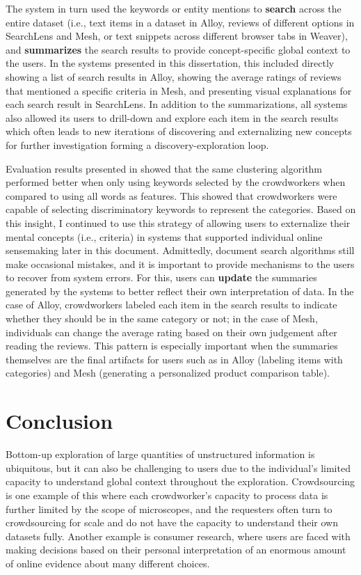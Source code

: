 The system in turn used the keywords or entity mentions to \textbf{search} across the entire dataset (i.e., text items in a dataset in Alloy, reviews of different options in SearchLens and Mesh, or text snippets across different browser tabs in Weaver), and \textbf{summarizes} the search results to provide concept-specific global context to the users. In the systems presented in this dissertation, this included directly showing a list of search results in Alloy, showing the average ratings of reviews that mentioned a specific criteria in Mesh, and presenting visual explanations for each search result in SearchLens. In addition to the summarizations, all systems also allowed its users to drill-down and explore each item in the search results which often leads to new iterations of discovering and externalizing new concepts for further investigation forming a discovery-exploration loop.

Evaluation results presented in  showed that the same clustering algorithm performed better when only using keywords selected by the crowdworkers when compared to using all words as features. This showed that crowdworkers were capable of selecting discriminatory keywords to represent the categories. Based on this insight, I continued to use this strategy of allowing users to externalize their mental concepts (i.e., criteria) in systems that supported individual online sensemaking later in this document. Admittedly, document search algorithms still make occasional mistakes, and it is important to provide mechanisms to the users to recover from system errors. For this, users can \textbf{update} the summaries generated by the systems to better reflect their own interpretation of data. In the case of Alloy, crowdworkers labeled each item in the search results to indicate whether they should be in the same category or not; in the case of Mesh, individuals can change the average rating based on their own judgement after reading the reviews. This pattern is especially important when the summaries themselves are the final artifacts for users such as in Alloy (labeling items with categories) and Mesh (generating a personalized product comparison table).


\section{Conclusion}

Bottom-up exploration of large quantities of unstructured information is ubiquitous, but it can also be challenging to users due to the individual's limited capacity to understand global context throughout the exploration. Crowdsourcing is one example of this where each crowdworker’s capacity to process data is further limited by the scope of microscopes, and the requesters often turn to crowdsourcing for scale and do not have the capacity to understand their own datasets fully. Another example is consumer research, where users are faced with making decisions based on their personal interpretation of an enormous amount of online evidence about many different choices.  

